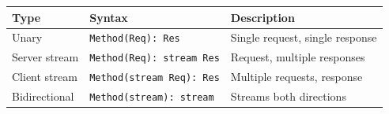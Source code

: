 \documentclass[10pt,onecolumn]{article}
\begin{document}
\begin{minipage}{\textwidth}
\small
\begin{tabular}{@{}llp{2in}@{}}
\toprule
\textbf{Type} & \textbf{Syntax} & \textbf{Description} \\
\midrule
Unary & \texttt{Method(Req): Res} & Single request, single response \\
Server stream & \texttt{Method(Req): stream Res} & Request, multiple responses \\
Client stream & \texttt{Method(stream Req): Res} & Multiple requests, response \\
Bidirectional & \texttt{Method(stream): stream} & Streams both directions \\
\bottomrule
\end{tabular}
\end{minipage}
\end{document}
